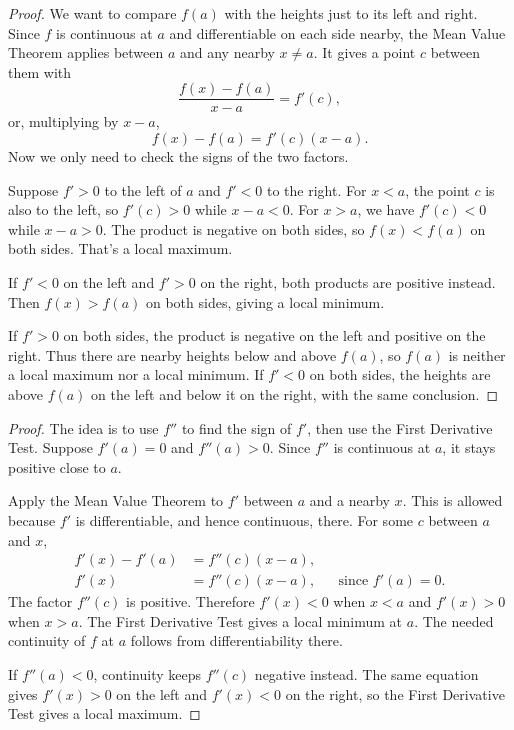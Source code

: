 
\begin{proof}
We want to compare $f(a)$ with the heights just to its left and right.
Since $f$ is continuous at $a$ and differentiable on each side nearby,
the Mean Value Theorem applies between $a$ and any nearby $x\ne a$.
It gives a point $c$ between them with
$$\frac{f(x)-f(a)}{x-a}=f'(c),$$
or, multiplying by $x-a$,
$$f(x)-f(a)=f'(c)(x-a).$$
Now we only need to check the signs of the two factors.

Suppose $f'>0$ to the left of $a$ and $f'<0$ to the right. For $x<a$,
the point $c$ is also to the left, so $f'(c)>0$ while $x-a<0$. For
$x>a$, we have $f'(c)<0$ while $x-a>0$. The product is negative on
both sides, so $f(x)<f(a)$ on both sides. That's a local maximum.

If $f'<0$ on the left and $f'>0$ on the right, both products are
positive instead. Then $f(x)>f(a)$ on both sides, giving a local minimum.

If $f'>0$ on both sides, the product is negative on the left and
positive on the right. Thus there are nearby heights below and above
$f(a)$, so $f(a)$ is neither a local maximum nor a local minimum.
If $f'<0$ on both sides, the heights are above $f(a)$ on the left and
below it on the right, with the same conclusion.
\end{proof}


\begin{proof}
The idea is to use $f''$ to find the sign of $f'$, then use the First
Derivative Test. Suppose $f'(a)=0$ and $f''(a)>0$. Since $f''$ is
continuous at $a$, it stays positive close to $a$.

Apply the Mean Value Theorem to $f'$ between $a$ and a nearby $x$.
This is allowed because $f'$ is differentiable, and hence continuous,
there. For some $c$ between $a$ and $x$,
\begin{align*}
f'(x)-f'(a)&=f''(c)(x-a),\\
f'(x)&=f''(c)(x-a), &&\text{since $f'(a)=0$.}
\end{align*}
The factor $f''(c)$ is positive. Therefore $f'(x)<0$ when $x<a$ and
$f'(x)>0$ when $x>a$. The First Derivative Test gives a local minimum
at $a$. The needed continuity of $f$ at $a$ follows from differentiability
there.

If $f''(a)<0$, continuity keeps $f''(c)$ negative instead. The same
equation gives $f'(x)>0$ on the left and $f'(x)<0$ on the right, so the
First Derivative Test gives a local maximum.
\end{proof}

